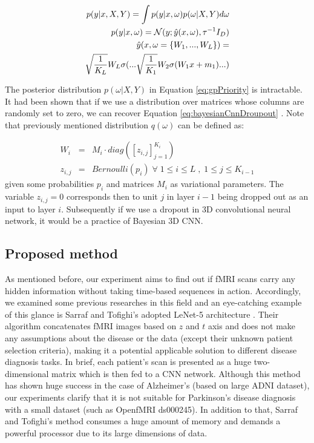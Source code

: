 \documentclass[a4paper,fleqn]{cas-dc}
\begin{document}
\begin{eqnarray}
\label{eq:gpPriority}
p(y | x,X,Y) = \int p(y|x,\omega) p(\omega|X,Y)d\omega \\ 
p(y|x,\omega) = \mathcal{N} (y ; \hat{y} (x,\omega) , \tau^{-1} I_D )  \nonumber \\
\hat{y} (x, \omega = \{ W_1, ..., W_L \}) =  \nonumber \\
\sqrt{1 \over K_L} W_L \sigma( ...  \sqrt{1 \over K_1} W_2 \sigma( W_1 x + m_1 ) ... )  \nonumber
\end{eqnarray}

The posterior distribution $p(\omega|X,Y)$ in Equation \eqref{eq:gpPriority} is intractable. It had been shown that if we use a distribution over matrices whose columns are randomly set to zero, we can recover Equation \eqref{eq:bayesianCnnDroupout} \cite{Gal2016}. Note that previously mentioned distribution $q(\omega)$ can be defined as:

\begin{eqnarray}
W_i &=& M_i \cdot diag([ z_{i,j} ]^{K_i}_{j=1} ) \nonumber \\ 
z_{i,j} &=& Bernoulli(p_i) \; \forall \; 1 \le i \le L \; , \; 1 \le j \le K_{i-1} \nonumber
\end{eqnarray}
\newline
given some probabilities $p_i$ and matrices $M_i$ as variational parameters. The variable $z_{i,j} = 0$ corresponds then to unit $j$ in layer $i-1$ being dropped out as an input to layer $i$. Subsequently if we use a dropout in 3D convolutional neural network, it would be a practice of Bayesian 3D CNN.





\subsection{Proposed method}
\label{section:proposedMethod}
As mentioned before, our experiment aims to find out if fMRI scans carry any hidden information without taking time-based sequences in action. Accordingly, we examined some previous researches in this field and an eye-catching example of this glance is Sarraf and Tofighi's adopted LeNet-5 architecture \cite{Sarraf2016}. Their algorithm concatenates fMRI images based on $z$ and $t$ axis and does not make any assumptions about the disease or the data (except their unknown patient selection criteria), making it a potential applicable solution to different disease diagnosis tasks. In brief, each patient's scan is presented as a huge two-dimensional matrix which is then fed to a CNN network. Although this method has shown huge success in the case of Alzheimer's (based on large ADNI dataset), our experiments clarify that it is not suitable for Parkinson's disease diagnosis with a small dataset (such as OpenfMRI ds000245). In addition to that, Sarraf and Tofighi's method consumes a huge amount of memory and demands a powerful processor due to its large dimensions of data.
\end{document}
